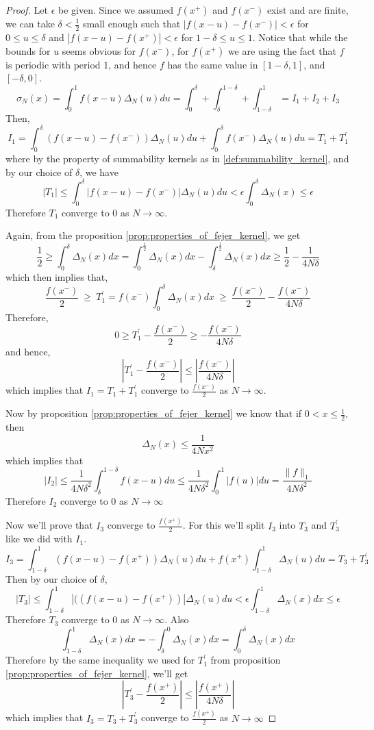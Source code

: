   \begin{proof}
    Let $\epsilon$ be given. Since we assumed $f(x^+)$ and $f(x^-)$ exist and are finite, we can take $\delta < \frac{1}{2}$ small enough such that $|f(x-u) - f(x^-)| < \epsilon$ for $0\le u \le \delta$ and $|f(x-u) - f(x^+)| < \epsilon$ for $1-\delta \le u \le 1$. Notice that while the bounds for $u$ seems obvious for $f(x^-)$, for $f(x^+)$ we are using the fact that $f$ is periodic with period 1, and hence $f$ has the same value in $[1-\delta, 1]$, and $[-\delta, 0]$.
    $$ \sigma_N(x) = \int_0^1 f(x-u)\Delta_N(u) du = \int_{0}^\delta + \int_\delta^{1-\delta} + \int_{1-\delta}^1 = I_1 + I_2 + I_3$$
    Then, 
    $$I_1 = \int_0^\delta (f(x-u) - f(x^-))\Delta_N(u)du + \int_0^\delta f(x^-)\Delta_N(u)du = T_1 + T_1^{'}$$
    where by the property of summability kernels as in \ref{def:summability_kernel}, and by our choice of $\delta$, we have
    $$|T_1| \le \int_0^\delta |f(x-u) - f(x^-)|\Delta_N(u)du < \epsilon \int_0^\delta \Delta_N(x) \le \epsilon$$
    Therefore $T_1$ converge to $0$ as $N \to \infty$.

    Again, from the proposition \ref{prop:properties_of_fejer_kernel}, we get
    $$\frac{1}{2} \ge \int_0^\delta \Delta_N(x) dx = \int_0^{\frac{1}{2}} \Delta_N(x) dx - \int_\delta^{\frac{1}{2}} \Delta_N(x) dx \ge \frac{1}{2} - \frac{1}{4N\delta}$$
    which then implies that, 
    $$\frac{f(x^-)}{2} \ \ge \ T_1^{'} = f(x^-)\int_0^\delta \Delta_N(x) dx \ \ge \ \frac{f(x^-)}{2} - \frac{f(x^-)}{4N\delta}  $$
    Therefore, 
    $$ 0\ge T_1^{'} - \frac{f(x^-)}{2} \ge -\frac{f(x^-)}{4N\delta} $$
    and hence, 
    $$\left| T_1^{'} - \frac{f(x^-)}{2}\right| \le \left|\frac{f(x^-)}{4N\delta}\right| $$
    which implies that $I_1 = T_1 + T_1^{'}$ converge to $\frac{f(x^-)}{2}$ as $N \to \infty$.

    Now by proposition \ref{prop:properties_of_fejer_kernel} we know that if $0 < x \le \frac{1}{2}$, then $$\Delta_N(x) \le \frac{1}{4Nx^2}$$ which implies that 
    $$ |I_2| \le \frac{1}{4N\delta^2}\int_\delta^{1-\delta}f(x-u) du \le \frac{1}{4N\delta^2}\int_0^1|f(u)|du = \frac{\|f\|_1}{4N\delta^2}$$
    Therefore $I_2$ converge to $0$ as $N \to \infty$

    Now we'll prove that $I_3$ converge to $\frac{f(x^+)}{2}$. For this we'll split $I_3$ into $T_3$ and $T_3^{'}$ like we did with $I_1$. 
    $$I_3 = \int_{1-\delta}^1 (f(x-u) - f(x^+))\Delta_N(u) du + f(x^+)\int_{1-\delta}^{1}\Delta_N(u) du = T_3 + T_3^{'}$$
    Then by our choice of $\delta$, 
    $$|T_3| \le \int_{1-\delta}^1 |((f(x-u) - f(x^+))|\Delta_N(u)du < \epsilon \int_{1-\delta}^1 \Delta_N(x) dx \le \epsilon$$
    Therefore $T_3$ converge to $0$ as $N \to \infty$.
    Also
      $$\int_{1-\delta}^1 \Delta_N(x) dx = -\int_{\delta}^0 \Delta_N(x) dx = \int_0^\delta \Delta_N(x) dx$$
      Therefore by the same inequality we used for $T_1^{'}$ from proposition \ref{prop:properties_of_fejer_kernel}, we'll get
      $$ \left| T_3^{'} - \frac{f(x^+)}{2} \right| \le \left|\frac{f(x^+)}{4N\delta} \right|$$
      which implies that $I_3 = T_3 + T_3^{'}$ converge to $\frac{f(x^+)}{2}$ as $N \to \infty$


\end{proof}
